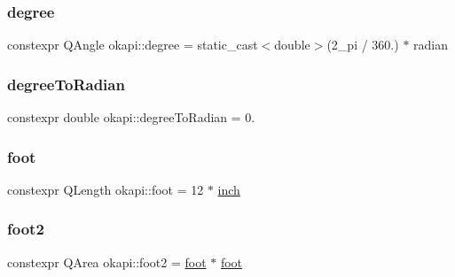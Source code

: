 \mbox{\label{namespaceokapi_a62211562b2e637742bd6e64748802211}} 
\subsubsection{\texorpdfstring{degree}{degree}}
{\footnotesize\ttfamily constexpr Q\+Angle okapi\+::degree = static\+\_\+cast$<$double$>$(2\+\_\+pi / 360.) $\ast$ radian}

\mbox{\label{namespaceokapi_a60e2f3e682c91a331aa5d89d8c0d6507}} 
\subsubsection{\texorpdfstring{degreeToRadian}{degreeToRadian}}
{\footnotesize\ttfamily constexpr double okapi\+::degree\+To\+Radian = 0.\hspace{0.3cm}{\ttfamily [static]}}

\mbox{\label{namespaceokapi_a76974d5bf7ed9473b2d59153894a8587}} 
\subsubsection{\texorpdfstring{foot}{foot}}
{\footnotesize\ttfamily constexpr Q\+Length okapi\+::foot = 12 $\ast$ \mbox{\hyperlink{namespaceokapi_a7da6f1f2fa46ec3694ba3f5361bcba80}{inch}}}

\mbox{\label{namespaceokapi_a30332192fb24d5d1f81883969ec4878a}} 
\subsubsection{\texorpdfstring{foot2}{foot2}}
{\footnotesize\ttfamily constexpr Q\+Area okapi\+::foot2 = \mbox{\hyperlink{namespaceokapi_a76974d5bf7ed9473b2d59153894a8587}{foot}} $\ast$ \mbox{\hyperlink{namespaceokapi_a76974d5bf7ed9473b2d59153894a8587}{foot}}}

\mbox{\label{namespaceokapi_a287daabad9e16ca8503cbadba7dde50c}} 
